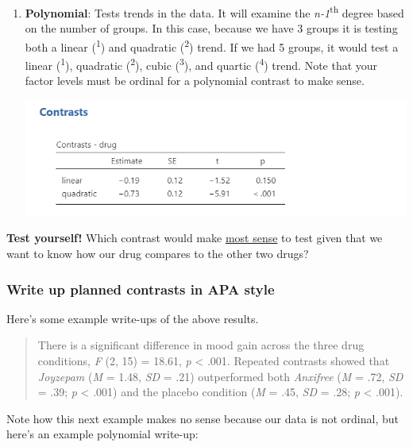\documentclass[
]{book}
\begin{document}
\begin{enumerate}
\def\labelenumi{\arabic{enumi}.}
\setcounter{enumi}{5}
\item
  \textbf{Polynomial}: Tests trends in the data. It will examine the \emph{n-1}\textsuperscript{th} degree based on the number of groups. In this case, because we have 3 groups it is testing both a linear (\textsuperscript{1}) and quadratic (\textsuperscript{2}) trend. If we had 5 groups, it would test a linear (\textsuperscript{1}), quadratic (\textsuperscript{2}), cubic (\textsuperscript{3}), and quartic (\textsuperscript{4}) trend. Note that your factor levels must be ordinal for a polynomial contrast to make sense.

  \includegraphics{images/04_one-way-anova/contrasts_polynomial.png}
\end{enumerate}

\textbf{Test yourself!} Which contrast would make \underline{most sense} to test given that we want to know how our drug compares to the other two drugs?

\hypertarget{write-up-planned-contrasts-in-apa-style}{%
\subsubsection{Write up planned contrasts in APA style}\label{write-up-planned-contrasts-in-apa-style}}

Here's some example write-ups of the above results.

\begin{quote}
There is a significant difference in mood gain across the three drug conditions, \emph{F} (2, 15) = 18.61, \emph{p} \textless{} .001. Repeated contrasts showed that \emph{Joyzepam} (\emph{M} = 1.48, \emph{SD} = .21) outperformed both \emph{Anxifree} (\emph{M} = .72, \emph{SD} = .39; \emph{p} \textless{} .001) and the placebo condition (\emph{M} = .45, \emph{SD} = .28; \emph{p} \textless{} .001).
\end{quote}

Note how this next example makes no sense because our data is not ordinal, but here's an example polynomial write-up:
\end{document}
